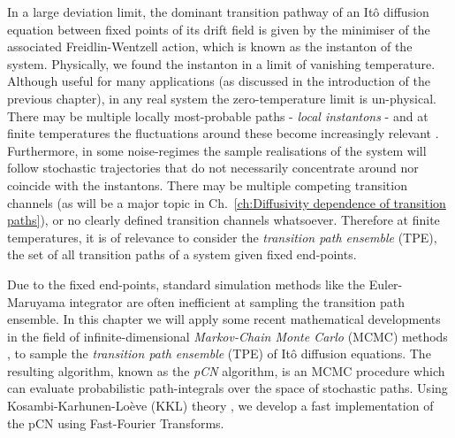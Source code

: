 In a large deviation limit, the dominant transition pathway of an Itô diffusion equation between fixed points of its drift field is given by the minimiser of the associated Freidlin-Wentzell action, which is known as the instanton of the system. Physically, we found the instanton in a limit of vanishing temperature. Although useful for many applications (as discussed in the introduction of the previous chapter), in any real system the zero-temperature limit is un-physical. There may be multiple locally most-probable paths - \textit{local instantons} - and at finite temperatures the fluctuations around these become increasingly relevant \citep{gelfandIntegrationFunctionalSpaces1960, nickelsenNoiseCorrectionLarge2022, corazzaNormalizedGaussianPath2020b, luGaussianApproximationsTransition2017a}. Furthermore, in some noise-regimes the sample realisations of the system will follow stochastic trajectories that do not necessarily concentrate around nor coincide with the instantons. There may be multiple competing transition channels (as will be a major topic in Ch.~\ref{ch:Diffusivity dependence of transition paths}), or no clearly defined transition channels whatsoever. Therefore at finite temperatures, it is of relevance to consider the \textit{transition path ensemble} (TPE), the set of all transition paths of a system given fixed end-points.

Due to the fixed end-points, standard simulation methods like the Euler-Maruyama integrator \citep{kloedenNumericalSolutionStochastic2011} are often inefficient at sampling the transition path ensemble. In this chapter we will apply some recent mathematical developments in the field of infinite-dimensional \textit{Markov-Chain Monte Carlo} (MCMC) methods \citep{cotterMCMCMethodsFunctions2013, beskosMCMCMETHODSDIFFUSION2008, hairerAnalysisSPDEsArising2005, hairerAnalysisSPDEsArising2007, hairerSpectralGapsMetropolis2014}, to sample the \textit{transition path ensemble} (TPE) of Itô diffusion equations. The resulting algorithm, known as the \textit{pCN} algorithm, is an MCMC procedure which can evaluate probabilistic path-integrals over the space of stochastic paths. Using Kosambi-Karhunen-Lo\`eve (KKL) theory \citep{kosambiParallelismPathspaces, karhunenUeberLineareMethoden1947, loeveProbabilityTheory1977}, we develop a fast implementation of the pCN using Fast-Fourier Transforms.

